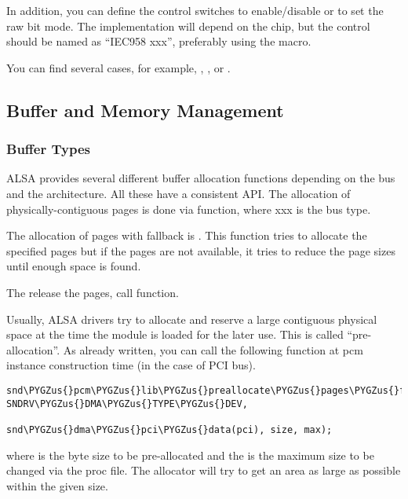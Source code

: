 \documentclass[a4paper,8pt,english]{sphinxmanual}
\def\PYGZus{\char`\_}
\begin{document}
In addition, you can define the control switches to enable/disable or to
set the raw bit mode. The implementation will depend on the chip, but
the control should be named as “IEC958 xxx”, preferably using the
 macro.

You can find several cases, for example, ,
, or .


\subsection{Buffer and Memory Management}
\label{sound/kernel-api/writing-an-alsa-driver:buffer-and-memory-management}

\subsubsection{Buffer Types}
\label{sound/kernel-api/writing-an-alsa-driver:buffer-types}
ALSA provides several different buffer allocation functions depending on
the bus and the architecture. All these have a consistent API. The
allocation of physically-contiguous pages is done via
 function, where xxx is the bus
type.

The allocation of pages with fallback is
. This function tries
to allocate the specified pages but if the pages are not available, it
tries to reduce the page sizes until enough space is found.

The release the pages, call 
function.

Usually, ALSA drivers try to allocate and reserve a large contiguous
physical space at the time the module is loaded for the later use. This
is called “pre-allocation”. As already written, you can call the
following function at pcm instance construction time (in the case of PCI
bus).

\begin{Verbatim}[commandchars=\\\{\}]
snd\PYGZus{}pcm\PYGZus{}lib\PYGZus{}preallocate\PYGZus{}pages\PYGZus{}for\PYGZus{}all(pcm, SNDRV\PYGZus{}DMA\PYGZus{}TYPE\PYGZus{}DEV,
                                      snd\PYGZus{}dma\PYGZus{}pci\PYGZus{}data(pci), size, max);
\end{Verbatim}

where  is the byte size to be pre-allocated and the  is
the maximum size to be changed via the  proc file. The
allocator will try to get an area as large as possible within the
given size.
\end{document}
